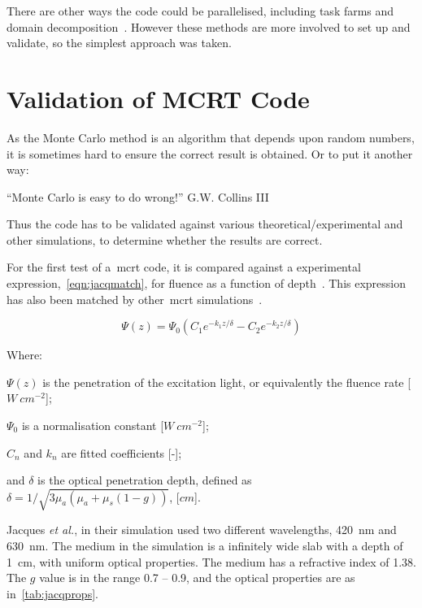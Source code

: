 There are other ways the code could be parallelised, including task farms and domain decomposition~\cite{barney2010introduction}.
However these methods are more involved to set up and validate, so the simplest approach was taken.
\FloatBarrier
\section{Validation of MCRT Code}\label{sec:validation}

As the Monte Carlo method is an algorithm that depends upon random numbers, it is sometimes hard to ensure the correct result is obtained.
Or to put it another way:
\medskip

``Monte Carlo is easy to do wrong!'' G.W. Collins III~\cite{bjormaneasymonte}

\medskip

Thus the code has to be validated against various theoretical/experimental and other simulations, to determine whether the results are correct.

For the first test of a~\gls*{mcrt} code, it is compared against a experimental expression,~\cref{eqn:jacqmatch}, for fluence as a function of depth~\cite{gardner1993fluorescence}.
This expression has also been matched by other~\gls*{mcrt} simulations~\cite{jacques1993photobleaching}.

\begin{equation}
\Psi(z)=\Psi_0(C_1e^{-k_1z/\delta}-C_2e^{-k_2z/\delta})
\label{eqn:jacqmatch}
\end{equation}

\noindent Where:

\indent $\Psi(z)$ is the penetration of the excitation light, or equivalently the fluence rate [$W\ cm^{-2}$];

\indent $\Psi_0$ is a normalisation constant [$W\ cm^{-2}$];

\indent $C_n$ and $k_n$ are fitted coefficients [-];

\indent and $\delta$ is the optical penetration depth, defined as $\delta=1/\sqrt{3\mu_a(\mu_a+\mu_s(1-g))}$, [$cm$].

\medskip

Jacques \textit{et al.}, in their simulation used two different wavelengths, 420~nm and 630~nm.
The medium in the simulation is a infinitely wide slab with a depth of 1~cm, with uniform optical properties. 
The medium has a refractive index of 1.38.
The $g$ value is in the range 0.7 -- 0.9, and the optical properties are as in~\cref{tab:jacqprops}.

